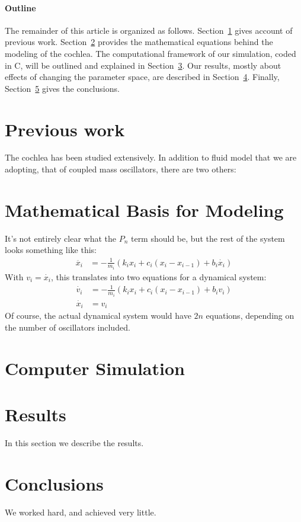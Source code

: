 \documentclass[12pt]{article}
\begin{document}
\paragraph{Outline}
The remainder of this article is organized as follows.
Section~\ref{previous work} gives account of previous work. Section~\ref{modeling} provides the mathematical equations behind the modeling of the cochlea. The computational framework of our simulation, coded in C, will be outlined and explained in Section~\ref{computer simulation}. Our results, mostly about effects of changing the parameter space, are described in Section~\ref{results}.
Finally, Section~\ref{conclusions} gives the conclusions.

\section{Previous work}\label{previous work}
The cochlea has been studied extensively. In addition to fluid model that we are adopting, that of coupled mass oscillators, there are two others: 


\section{Mathematical Basis for Modeling}\label{modeling}
It's not entirely clear what the $P_n$ term should be, but the rest of the system looks something like this:
\begin{align*}
  \ddot{x_i} &= - \frac{1}{m_i} \left( k_i x_i + c_i (x_i-x_{i-1}) + b_i \dot{x_i} \right)
\end{align*}
With $v_i=\dot{x_i}$, this translates into two equations for a dynamical system:
\begin{align*}
  \dot{v_i} &= - \frac{1}{m_i} \left( k_i x_i + c_i (x_i-x_{i-1}) + b_i v_i \right) \\
  \dot{x_i} &= v_i
\end{align*}
Of course, the actual dynamical system would have $2n$ equations, depending on the number
of oscillators included.




\section{Computer Simulation}\label{computer simulation}


\section{Results}\label{results}
In this section we describe the results.

\section{Conclusions}\label{conclusions}
We worked hard, and achieved very little.

%
%
\end{document}
